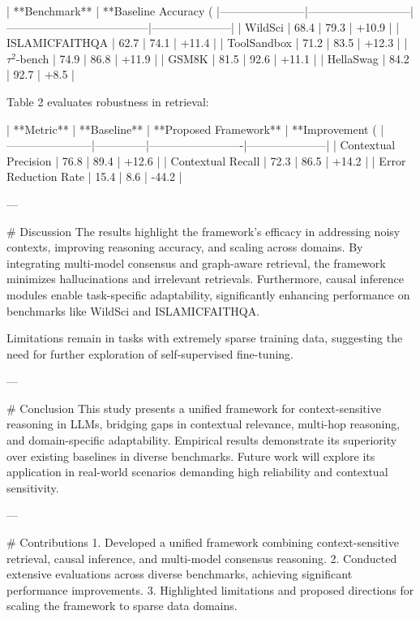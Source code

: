 | **Benchmark**        | **Baseline Accuracy (%
|-----------------------|---------------------------|--------------------------------------|---------------------|
| WildSci              | 68.4                      | 79.3                               | +10.9               |
| ISLAMICFAITHQA       | 62.7                      | 74.1                               | +11.4               |
| ToolSandbox          | 71.2                      | 83.5                               | +12.3               |
| $τ^2$-bench          | 74.9                      | 86.8                               | +11.9               |
| GSM8K                | 81.5                      | 92.6                               | +11.1               |
| HellaSwag            | 84.2                      | 92.7                               | +8.5                |

Table 2 evaluates robustness in retrieval:  

| **Metric**           | **Baseline** | **Proposed Framework** | **Improvement (%
|-----------------------|--------------|-------------------------|---------------------|
| Contextual Precision  | 76.8         | 89.4                    | +12.6              |
| Contextual Recall     | 72.3         | 86.5                    | +14.2              |
| Error Reduction Rate  | 15.4         | 8.6                     | -44.2              |

---

# Discussion  
The results highlight the framework's efficacy in addressing noisy contexts, improving reasoning accuracy, and scaling across domains. By integrating multi-model consensus and graph-aware retrieval, the framework minimizes hallucinations and irrelevant retrievals. Furthermore, causal inference modules enable task-specific adaptability, significantly enhancing performance on benchmarks like WildSci and ISLAMICFAITHQA.

Limitations remain in tasks with extremely sparse training data, suggesting the need for further exploration of self-supervised fine-tuning.

---

# Conclusion  
This study presents a unified framework for context-sensitive reasoning in LLMs, bridging gaps in contextual relevance, multi-hop reasoning, and domain-specific adaptability. Empirical results demonstrate its superiority over existing baselines in diverse benchmarks. Future work will explore its application in real-world scenarios demanding high reliability and contextual sensitivity.

---

# Contributions  
1. Developed a unified framework combining context-sensitive retrieval, causal inference, and multi-model consensus reasoning.  
2. Conducted extensive evaluations across diverse benchmarks, achieving significant performance improvements.  
3. Highlighted limitations and proposed directions for scaling the framework to sparse data domains.  

